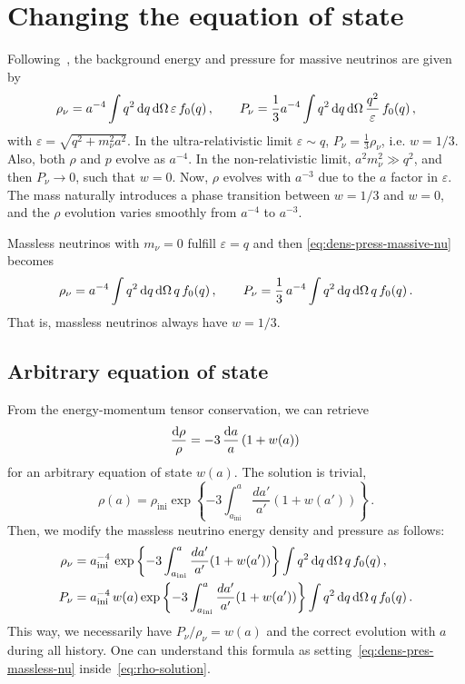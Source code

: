 \section{Changing the equation of state}
Following~\cite{Ma1995}, the background energy and pressure for massive neutrinos are given by
\begin{equation}\label{eq:dens-press-massive-nu}
    \rho_\nu = a^{-4} \int q^2\,  \mathrm{d} q\, \mathrm{d}\Omega\,  \varepsilon\,  f_0(q)\, ,\qquad
    P_\nu = \frac{1}{3}a^{-4} \int q^2\, \mathrm{d} q\,  \mathrm{d}\Omega\, \frac{q^2}{\varepsilon}\, f_0(q) \, ,
\end{equation}with $\varepsilon = \sqrt{q^2 + m_\nu^2 a^2}$. In the ultra-relativistic limit $\varepsilon\sim q$, $P_\nu = \frac{1}{3}\rho_\nu$, i.e. $w = 1/3$. Also, both $\rho$ and $p$ evolve as $a^{-4}$. In the non-relativistic limit, $a^2m_\nu^2\gg q^2$, and then $P_\nu \to 0$, such that $w = 0$. Now, $\rho$ evolves with $a^{-3}$ due to the $a$ factor in $\varepsilon$. The mass naturally introduces a phase transition between $w = 1/3$ and $w=0$, and the $\rho$ evolution varies smoothly from $a^{-4}$ to $a^{-3}$. 

Massless neutrinos with $m_\nu=0$ fulfill $\varepsilon = q$ and then \eqref{eq:dens-press-massive-nu} becomes 
\begin{equation}\label{eq:dens-press-massless-nu}
    \rho_\nu = a^{-4}  \int q^2\,  \mathrm{d} q \, \mathrm{d} \Omega\,  q\,  f_0(q)\, ,\qquad
    P_\nu = \frac{1}{3}\, a^{-4} \int q^2\, \mathrm{d} q\,  \mathrm{d} \Omega\,  q\,  f_0(q) \, .
\end{equation}That is, massless neutrinos always have $w = 1/3$. 

\subsection{Arbitrary equation of state}
From the energy-momentum tensor conservation, we can retrieve
\begin{equation}
    \frac{\mathrm{d} \rho}{\rho} = -3\, \frac{\mathrm{d} a}{a}\, (1+w(a))\, 
\end{equation}for an arbitrary equation of state $w(a)$. The solution is trivial,
\begin{equation}\label{eq:rho-solution}
    \rho(a) = \rho_{\mathrm{ini}} \exp\left\{-3\int_{a_{\mathrm{ini}}}^a \frac{da'}{a'}(1+w(a')) \right\}\, .
\end{equation}
Then, we modify the massless neutrino energy density and pressure as follows:
\begin{align}\label{eq:eos-energy-density}
    \rho_\nu &= a_{\mathrm{ini}}^{-4}\, \exp\left\{-3\int_{a_{\mathrm{ini}}}^a \frac{da'}{a'}(1+w(a')) \right\}\int q^2\,  \mathrm{d} q \, \mathrm{d} \Omega\,  q\,  f_0(q)\, ,\qquad \\
    P_\nu &= a_{\mathrm{ini}}^{-4}\, w(a)\exp\left\{-3\int_{a_{\mathrm{ini}}}^a \frac{da'}{a'}(1+w(a')) \right\} \int q^2\, \mathrm{d} q\,  \mathrm{d} \Omega\,  q\,  f_0(q) \, . \label{eq:eos-pressure}
\end{align}This way, we necessarily have $P_\nu/\rho_\nu = w(a)$ and the correct evolution with $a$ during all history. 
One can understand this formula as setting~\eqref{eq:dens-pres-massless-nu} inside~\eqref{eq:rho-solution}.

